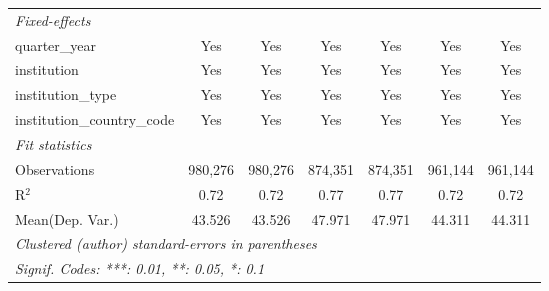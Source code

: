 \begin{tabular}{lcccccc}
   \midrule
   \emph{Fixed-effects}\\
   quarter\_year                      & Yes     & Yes      & Yes        & Yes      & Yes     & Yes\\  
   institution                        & Yes     & Yes      & Yes        & Yes      & Yes     & Yes\\  
   institution\_type                  & Yes     & Yes      & Yes        & Yes      & Yes     & Yes\\  
   institution\_country\_code         & Yes     & Yes      & Yes        & Yes      & Yes     & Yes\\  
   \midrule
   \emph{Fit statistics}\\
   Observations                       & 980,276 & 980,276  & 874,351    & 874,351  & 961,144 & 961,144\\  
   R$^2$                              & 0.72    & 0.72     & 0.77       & 0.77     & 0.72    & 0.72\\  
Mean(Dep. Var.) & 43.526 & 43.526 & 47.971 & 47.971 & 44.311 & 44.311 \\
   \midrule \midrule
   \multicolumn{7}{l}{\emph{Clustered (author) standard-errors in parentheses}}\\
   \multicolumn{7}{l}{\emph{Signif. Codes: ***: 0.01, **: 0.05, *: 0.1}}\\
\end{tabular}
\par\endgroup
